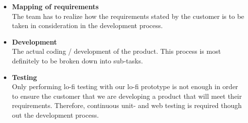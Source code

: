 \begin{itemize}
    \item{\textbf{Mapping of requirements}} \\
    The team has to realize how the requirements stated by the customer is to be taken in consideration in the development process. 
    \item{\textbf{Development}} \\
    The actual coding / development of the product. This process is most definitely to be broken down into sub-tasks. 
    \item{\textbf{Testing}} \\
    Only performing lo-fi testing with our lo-fi prototype is not enough in order to ensure the customer that we are developing a product that will meet their requirements. Therefore, continuous unit- and web testing is required though out the development process. 

\end{itemize}






